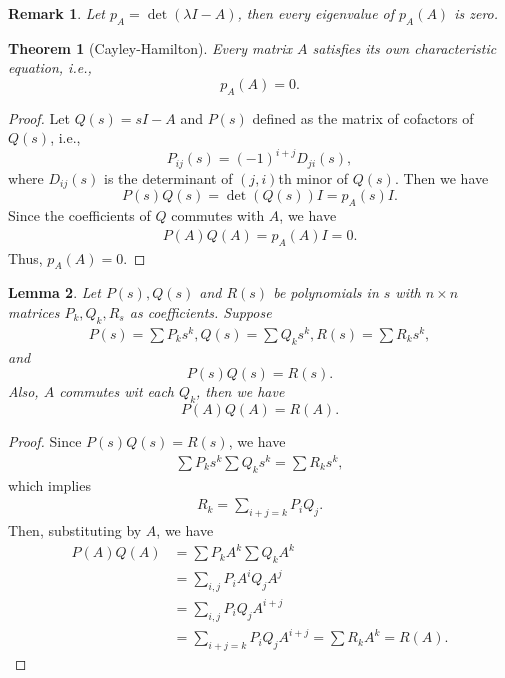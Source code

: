 \documentclass[10pt]{book}
\newtheorem{theorem}{Theorem}[chapter]
\newtheorem{lemma}[theorem]{Lemma}
\newtheorem{remark}{Remark}[chapter]
\theoremstyle{definition}
\numberwithin{equation}{chapter}
\begin{document}
\begin{remark}
Let $p_A = \det(\lambda I - A)$, then every eigenvalue of $p_A(A)$ is zero.
\end{remark}

\medskip

\begin{theorem}[Cayley-Hamilton]
Every matrix $A$ satisfies its own characteristic equation, i.e.,
$$p_A(A) = 0.$$
\end{theorem}
\begin{proof}
Let $Q(s) = sI - A$ and $P(s)$ defined as the matrix of cofactors of $Q(s)$, i.e., 
$$P_{ij}(s) = (-1)^{i+j}D_{ji}(s),$$
where $D_{ij}(s)$ is the determinant of $(j,i)$th minor of $Q(s)$. Then we have 
$$P(s)Q(s) = \det (Q(s)) I = p_A(s)I.$$
Since the coefficients of $Q$ commutes with $A$, we have 
\begin{align*}
    P(A)Q(A) = p_A(A)I = 0.
\end{align*}
Thus, $p_A(A) = 0$.
\end{proof}

\medskip

\begin{lemma}
Let $P(s), Q(s)$ and $R(s)$ be polynomials in $s$ with $n\times n$ matrices $P_k, Q_k, R_s$ as coefficients. Suppose
\begin{align*}
    P(s) = \sum P_k s^k, Q(s) = \sum Q_k s^k, R(s) = \sum R_k s^k,
\end{align*}
and 
$$P(s)Q(s) = R(s).$$
Also, $A$ commutes wit each $Q_k$, then we have 
$$P(A)Q(A) = R(A).$$
\end{lemma}
\begin{proof}
Since $P(s)Q(s) = R(s)$, we have
\begin{align*}
    \sum P_k s^k \sum Q_k s^k = \sum R_k s^k,
\end{align*}
which implies 
\begin{align*}
    R_k = \sum_{i+j=k} P_i Q_j.
\end{align*}
Then, substituting by $A$, we have
\begin{align*}
    P(A)Q(A) & = \sum P_k A^k \sum Q_k A^k \\
    & = \sum_{i,j} P_i A^i Q_j A^j \\
    & = \sum_{i,j} P_i Q_j A^{i+j} \\
    & = \sum_{i+j=k} P_i Q_j A^{i+j} = \sum R_k A^k = R(A).
\end{align*}
\end{proof}

\medskip
\end{document}
